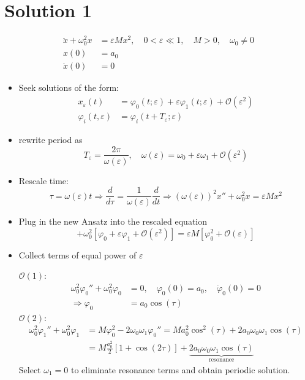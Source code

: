 \documentclass[twoside,10pt,a4paper]{article}
\begin{document}
\section*{Solution 1}
\begin{align*}
	\ddot{x} + \omega_0^2 x &= \varepsilon Mx^2, \quad 0 < \varepsilon \ll 1, \quad M>0, \quad \omega_0 \neq 0 \\
	x(0) &= a_0 \\
	\dot{x}(0) &= 0
\end{align*}
\begin{itemize}
	\item Seek solutions of the form:
		\begin{align*}
			x_\varepsilon(t) &= \varphi_0(t;\varepsilon) + \varepsilon\varphi_1(t;\varepsilon) + \mathcal{O}(\varepsilon^2) \\
			\varphi_i (t, \varepsilon) &= \varphi_i(t + T_\varepsilon; \varepsilon)
		\end{align*}
	\item rewrite period as
		\begin{equation*}
			T_\varepsilon = \frac{2\pi}{\omega(\varepsilon)}, \quad \omega(\varepsilon) = \omega_0 + \varepsilon \omega_1 + \mathcal{O}(\varepsilon^2)
		\end{equation*}
	\item Rescale time: 
		\begin{equation}
			\tau = \omega(\varepsilon)t \Longrightarrow \boxed{\frac{d}{d\tau} = \frac{1}{\omega(\varepsilon)}\frac{d}{dt}} \Longrightarrow \boxed{\left(\omega(\varepsilon)\right)^2x''+\omega_0^2 x = \varepsilon M x^2}
		\end{equation}
	\item Plug in the new Ansatz into the rescaled equation
		\begin{equation*}
			[\omega_0^2 + 2\varepsilon \omega_0 \omega_1 + \mathcal{O}(\varepsilon^2)][\varphi_0'' + \varepsilon \varphi_1''+ \mathcal{O}(\varepsilon^2)] + \omega_0^2[\varphi_0 + \varepsilon \varphi_1+ \mathcal{O}(\varepsilon^2)] = \varepsilon M [\varphi_0^2 + \mathcal{O}(\varepsilon)]
		\end{equation*}
	\item Collect terms of equal power of $\varepsilon$
	
	$\mathcal{O}(1)$:
	\begin{align*}
		\omega_0^2\varphi_0'' + \omega_0^2 \varphi_0 &= 0, \quad \varphi_0(0) = a_0, \quad \dot{\varphi}_0(0)=0 \\
		\Longrightarrow \varphi_0 &= a_0 \cos(\tau)
	\end{align*}
	$\mathcal{O}(2)$:
	\begin{align*}
		\omega_0^2\varphi_1'' + \omega_0^2 \varphi_1 &= M \varphi_0^2 - 2\omega_0\omega_1\varphi_0'' = Ma_0^2 \cos^2(\tau) + 2a_0\omega_0\omega_1 \cos(\tau) \\
		&= M \frac{a_0^2}{2}[1 + \cos(2\tau)] + \underbrace{2a_0\omega_0\omega_1\cos(\tau)}_{\text{resonance}}
	\end{align*}
	Select $\omega_1 = 0$ to eliminate resonance terms and obtain periodic solution.
	

\end{itemize}
\end{document}
